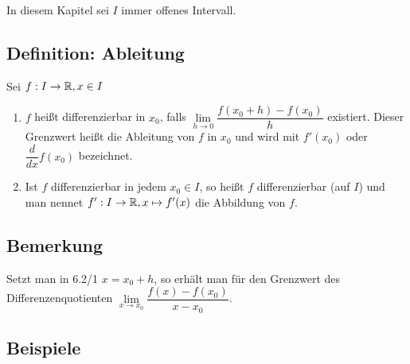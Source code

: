 \documentclass[10pt, a4paper, fleqn]{article}
\begin{document}
\bigskip
In diesem Kapitel sei $I$ immer offenes Intervall.
\subsection{Definition: Ableitung}
Sei $f: I \to \mathbb{R}, x \in I$
\begin{enumerate}[1.]
    \item $f$ heißt differenzierbar in $x_0$, falls
    $\lim\limits_{h \to 0} \dfrac{f(x_0 + h) - f(x_0)}{h}$ existiert. Dieser
    Grenzwert heißt die Ableitung von $f$ in $x_0$ und wird mit $f'(x_0)$ oder
    $\dfrac{d}{dx} f(x_0)$ bezeichnet.

    \item Ist $f$ differenzierbar in jedem $x_0 \in I$, so heißt $f$ differenzierbar
    (auf $I$) und man nennet $f': I \to \mathbb{R}, x \mapsto f'(x)$ die Abbildung von $f$.
\end{enumerate}

\subsection{Bemerkung}

Setzt man in 6.2/1 $x = x_0 + h$, so erhält man für den Grenzwert des
Differenzenquotienten $\lim\limits_{x \to x_0} \dfrac{f(x) - f(x_0)}{x - x_0}$.

\subsection{Beispiele}
\end{document}
